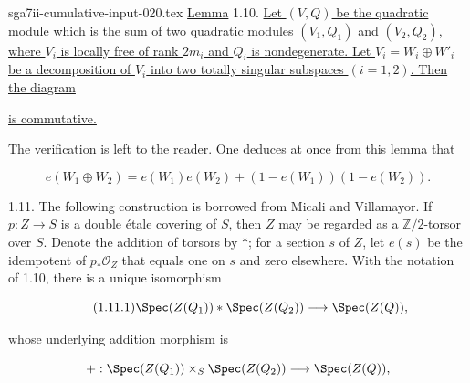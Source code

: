 \begin{filecontents*}{sga7ii-cumulative-input-020.tex}
\underline{Lemma} 1.10. \underline{Let $(V,Q)$ be the quadratic module
which is the sum of two quadratic modules $(V_1,Q_1)$ and $(V_2,Q_2)$,
where $V_i$ is locally free of rank $2m_i$ and $Q_i$ is nondegenerate.
Let $V_i=W_i\oplus W'_i$ be a decomposition of $V_i$ into two totally
singular subspaces $(i=1,2)$.  Then the diagram}

\begin{center}
\end{center}

\underline{is commutative.}


The verification is left to the reader.  One deduces at once from this
lemma that

\begin{equation}\tag{1.10.1}
e(W_1\oplus W_2)
=e(W_1)e(W_2)+(1-e(W_1))(1-e(W_2)).
\end{equation}

1.11. The following construction is borrowed from Micali and Villamayor.
If $p:Z\longrightarrow S$ is a double étale covering of $S$, then $Z$ may
be regarded as a $\mathbb Z/2$-torsor over $S$.  Denote the addition of
torsors by $*$; for a section $s$ of $Z$, let $e(s)$ be the idempotent of
$p_*\mathcal O_Z$ that equals one on $s$ and zero elsewhere.  With the
notation of 1.10, there is a unique isomorphism

\begin{equation}\tag{1.11.1}
\Spec(Z(Q_1))*\Spec(Z(Q_2))\longrightarrow\Spec(Z(Q)),
\end{equation}

whose underlying addition morphism is

\begin{equation*}
+:\Spec(Z(Q_1))\times_S\Spec(Z(Q_2))
\longrightarrow\Spec(Z(Q)),
\end{equation*}


\end{filecontents*}
